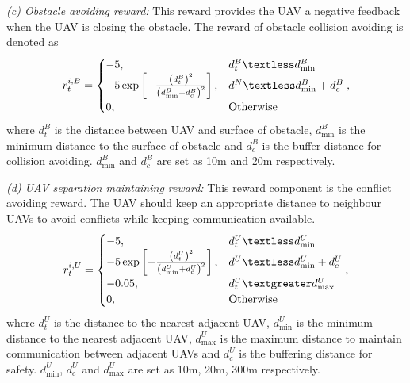 \documentclass[journal]{IEEEtran}
\begin{document}
\textit{(c) Obstacle avoiding reward:} This reward provides the UAV a negative feedback when the UAV is closing the obstacle. The reward of obstacle collision avoiding is denoted as 
\begin{equation}\label{reward_2}
r^{i,B}_{t}=
\begin{cases}
            -5, & \mbox{$d_{t}^{B}\textless d_{\min}^{B}$}\\
            -5\exp\left[{-\frac{\left({d_{t}^{B}}\right)^2}{\left(d_{\min}^{B}+d^{B}_{c}\right)^2}}\right], & \mbox{$d^N\textless d_{\min}^{B}+d^{B}_{c}$}\\
            0, & \mbox{Otherwise}
\end{cases},
\end{equation}
where $d_{t}^{B}$ is the distance between UAV and surface of obstacle, $d_{\min}^{B}$ is the minimum distance to the surface of obstacle and $d^{B}_{c}$ is the buffer distance for collision avoiding. $d_{\min}^{B}$ and $d^{B}_{c}$ are set as 10m and 20m respectively. 

\textit{(d) UAV separation maintaining reward:} This reward component is the conflict avoiding reward. The UAV should keep an appropriate distance to neighbour UAVs to avoid conflicts while keeping communication available. 
\begin{equation}\label{reward_3}
r^{i,U}_{t}=
\begin{cases}
            -5, & \mbox{$d^{U}_{t}\textless d^{U}_{\min}$}\\
            -5\exp\left[{-\frac{\left({d^{U}_{t}}\right)^2}{\left(d^{U}_{\min}+d^{U}_{c}\right)^2}}\right], & \mbox{$d^U\textless d^{U}_{\min}+d^{U}_{c}$}\\
            -0.05, & \mbox{$d^{U}_{t}\textgreater d^{U}_{\max}$}\\
            0, & \mbox{Otherwise}
\end{cases},
\end{equation}
where $d^{U}_{t}$ is the distance to the nearest adjacent UAV, $d^{U}_{\min}$ is the minimum distance to the nearest adjacent UAV, $d^{U}_{\max}$ is the maximum distance to maintain communication between adjacent UAVs and $d^{U}_{c}$ is the buffering distance for safety. $d^{U}_{\min}$, $d^{U}_{c}$ and $d^{U}_{\max}$ are set as 10m, 20m, 300m respectively. 
\end{document}
